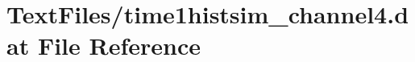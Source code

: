 \hypertarget{TextFiles_2time1histsim__channel4_8dat}{}\section{Text\+Files/time1histsim\+\_\+channel4.dat File Reference}
\label{TextFiles_2time1histsim__channel4_8dat}
